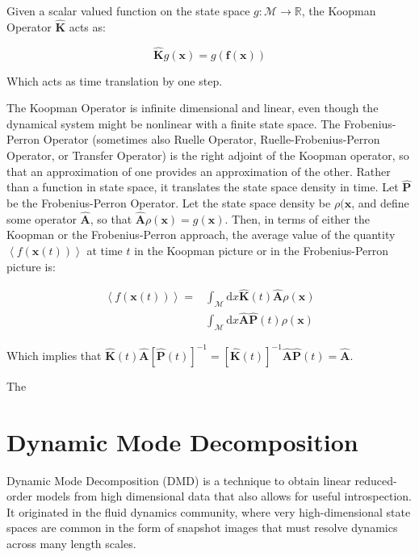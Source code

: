 Given a scalar valued function on the state space $g:\mathscr{M} \rightarrow \mathbb{R}$, the Koopman Operator $\mathbf{\hat{K}}$ acts as:

\begin{equation}
\mathbf{\hat{K}}g(\mathbf{x}) = g(\mathbf{f}(\mathbf{x}))
\end{equation} 

Which acts as time translation by one step.

The Koopman Operator is infinite dimensional and linear, even though the dynamical system might be nonlinear with a finite state space. The Frobenius-Perron Operator (sometimes also Ruelle Operator, Ruelle-Frobenius-Perron Operator, or Transfer Operator) is the right adjoint of the Koopman operator, so that an approximation of one provides an approximation of the other. Rather than a function in state space, it translates the state space density in time. Let $\mathbf{\hat{P}}$ be the Frobenius-Perron Operator. Let the state space density be $\rho(\mathbf{x}$, and define some operator $\mathbf{\hat{A}}$, so that $\mathbf{\hat{A}}\rho(\mathbf{x}) = g(\mathbf{x})$. Then, in terms of either the Koopman or the Frobenius-Perron approach, the average value of the quantity $\left< f(\mathbf{x}(t))\right>$ at time $t$ in the Koopman picture or in the Frobenius-Perron picture is:

\begin{equation}
\begin{array}{rl}
\left< f(\mathbf{x}(t))\right> =& \int_\mathscr{M} \mathrm{d}x \mathbf{\hat{K}}(t)\mathbf{\hat{A}}\rho(\mathbf{x}) \\
& \int_\mathscr{M} \mathrm{d}x \mathbf{\hat{A}}\mathbf{\hat{P}}(t)\rho(\mathbf{x})
\end{array}
\end{equation}

Which implies that $\mathbf{\hat{K}}(t)\mathbf{\hat{A}} \left[\mathbf{\hat{P}}(t)\right]^{-1} = \left[\mathbf{\hat{K}}(t) \right]^{-1} \mathbf{\hat{A}} \mathbf{\hat{P}}(t) = \mathbf{\hat{A}}$.


The 


\section{Dynamic Mode Decomposition}
Dynamic Mode Decomposition (DMD) is a technique to obtain linear reduced-order models from high dimensional data that also allows for useful introspection. It originated in the fluid dynamics community, where very high-dimensional state spaces are common in the form of snapshot images that must resolve dynamics across many length scales.

